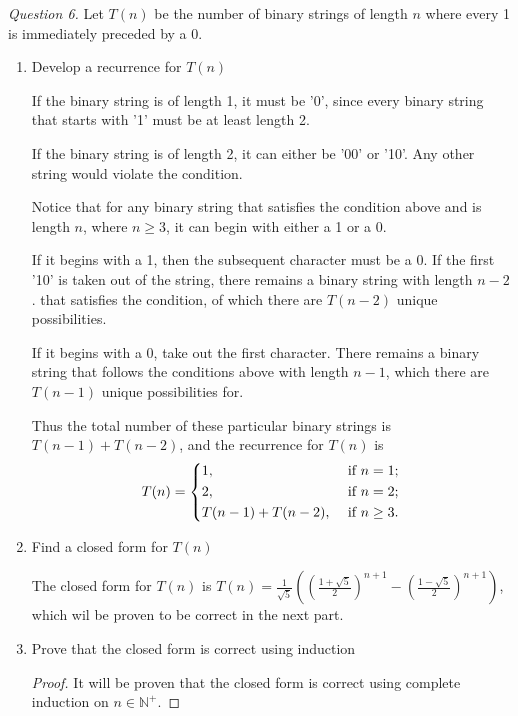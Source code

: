 \documentclass[11pt]{article}
\begin{document}
    \textit{Question 6.} Let \(T(n)\) be the number of binary strings of length \(n\) where every 1 is immediately preceded by a 0.
    \begin{enumerate}[label=(\alph*)]
        \item Develop a recurrence for \(T(n)\)
        
        If the binary string is of length 1, it must be '0', since every binary string that starts with '1' must be at least length 2.

        If the binary string is of length 2, it can either be '00' or '10'. Any other string would violate the condition.

        Notice that for any binary string that satisfies the condition above and is length \(n\), where \(n\geq 3\), it can begin with either a 1 or a 0.

        If it begins with a 1, then the subsequent character must be a 0. If the first '10' is taken out of the string, there remains a binary string with length \(n-2\). that satisfies the condition, of which there are \(T(n-2)\) unique possibilities.

        If it begins with a 0, take out the first character. There remains a binary string that follows the conditions above with length \(n-1\), which there are \(T(n-1)\) unique possibilities for.

        Thus the total number of these particular binary strings is \(T(n-1) + T(n-2)\), and the recurrence for \(T(n)\) is
        \[
            T(n)=\begin{dcases}
                1, &\text{ if } n=1 ;\\
                2, &\text{ if } n=2 ;\\
                T(n-1) + T(n-2), &\text{ if } n\geq 3.
            \end{dcases}
        \]

        \item Find a closed form for \(T(n)\) 
        
        The closed form for \(T(n)\) is \(T(n)=\frac{1}{\sqrt{5}}\left(\left(\frac{1+\sqrt{5}}{2}\right)^{n+1} - \left(\frac{1-\sqrt{5}}{2}\right)^{n+1}\right)\), which wil be proven to be correct in the next part.

        \item Prove that the closed form is correct using induction
        
        \begin{proof}
            It will be proven that the closed form is correct using complete induction on \(n \in \mathbb{N}^+\).


\end{proof}
\end{enumerate}
\end{document}
